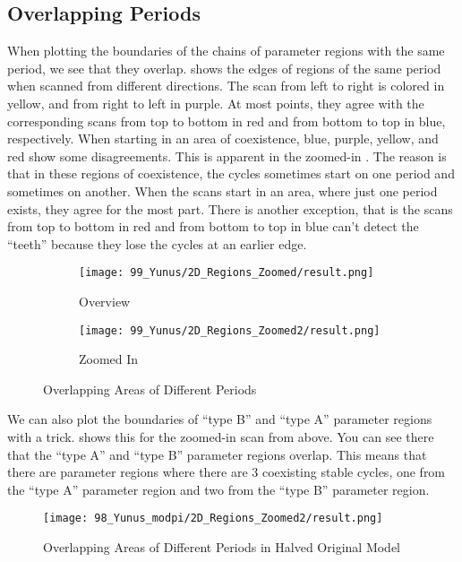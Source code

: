 \subsection{Overlapping Periods}

When plotting the boundaries of the chains of parameter regions with the same period, we see that they overlap.
 shows the edges of regions of the same period when scanned from different directions.
The scan from left to right is colored in yellow, and from right to left in purple.
At most points, they agree with the corresponding scans from top to bottom in red and from bottom to top in blue, respectively.
When starting in an area of coexistence, blue, purple, yellow, and red show some disagreements.
This is apparent in the zoomed-in .
The reason is that in these regions of coexistence, the cycles sometimes start on one period and sometimes on another.
When the scans start in an area, where just one period exists, they agree for the most part.
There is another exception, that is the scans from top to bottom in red and from bottom to top in blue can't detect the ``teeth'' because they lose the cycles at an earlier edge.

\begin{figure}
	\centering
	\begin{subfigure}{0.4\textwidth}
		\texttt{[image: 99\_Yunus/2D\_Regions\_Zoomed/result.png]}
		\caption{Overview}
		\label{fig:yunus.period.regions}
	\end{subfigure}
	\begin{subfigure}{0.4\textwidth}
		\texttt{[image: 99\_Yunus/2D\_Regions\_Zoomed2/result.png]}
		\caption{Zoomed In}
		\label{fig:yunus.period.regions.zoomed}
	\end{subfigure}
	\caption{Overlapping Areas of Different Periods}
\end{figure}

We can also plot the boundaries of ``type B'' and ``type A'' parameter regions with a trick.
 shows this for the zoomed-in scan from above.
You can see there that the ``type A'' and ``type B'' parameter regions overlap.
This means that there are parameter regions where there are 3 coexisting stable cycles, one from the ``type A'' parameter region and two from the ``type B'' parameter region.

\begin{figure}
	\centering
	\texttt{[image: 98\_Yunus\_modpi/2D\_Regions\_Zoomed2/result.png]}
	\caption{Overlapping Areas of Different Periods in Halved Original Model}
	\label{fig:yunus.halved.period.regions.zoomed}
\end{figure}
